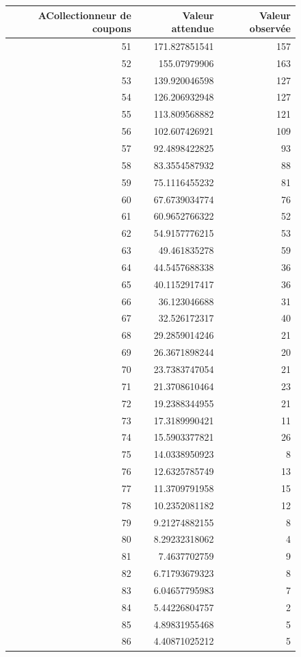 \documentclass[10pt,a4paper]{article}
\begin{document}
\begin{figure}[h]
\centering
\begin{tabular}{|r|r|r|}
\hline
ACollectionneur de coupons & Valeur attendue & Valeur observée\\
\hline
51 & 171.827851541 & 157\\
52 & 155.07979906 & 163\\
53 & 139.920046598 & 127\\
54 & 126.206932948 & 127\\
55 & 113.809568882 & 121\\
56 & 102.607426921 & 109\\
57 & 92.4898422825 & 93\\
58 & 83.3554587932 & 88\\
59 & 75.1116455232 & 81\\
60 & 67.6739034774 & 76\\
61 & 60.9652766322 & 52\\
62 & 54.9157776215 & 53\\
63 & 49.461835278 & 59\\
64 & 44.5457688338 & 36\\
65 & 40.1152917417 & 36\\
66 & 36.123046688 & 31\\
67 & 32.526172317 & 40\\
68 & 29.2859014246 & 21\\
69 & 26.3671898244 & 20\\
70 & 23.7383747054 & 21\\
71 & 21.3708610464 & 23\\
72 & 19.2388344955 & 21\\
73 & 17.3189990421 & 11\\
74 & 15.5903377821 & 26\\
75 & 14.0338950923 & 8\\
76 & 12.6325785749 & 13\\
77 & 11.3709791958 & 15\\
78 & 10.2352081182 & 12\\
79 & 9.21274882155 & 8\\
80 & 8.29232318062 & 4\\
81 & 7.4637702759 & 9\\
82 & 6.71793679323 & 8\\
83 & 6.04657795983 & 7\\
84 & 5.44226804757 & 2\\
85 & 4.89831955468 & 5\\
86 & 4.40871025212 & 5\\

\end{tabular}
\end{figure}
\end{document}
